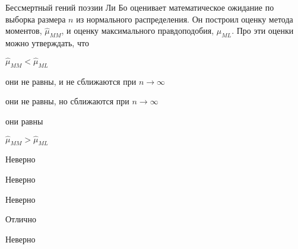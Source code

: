 
\begin{question}
Бессмертный гений поэзии Ли Бо оценивает математическое ожидание по
выборка размера \(n\) из нормального распределения. Он построил оценку
метода моментов, \(\hat{\mu}_{MM}\), и оценку максимального
правдоподобия, \(\hat{\mu}_{ML}\). Про эти оценки можно утверждать, что
\begin{answerlist}
  \item \(\hat\mu_{MM}<\hat\mu_{ML}\)
  \item они не равны, и не сближаются при \(n\to \infty\)
  \item они не равны, но сближаются при \(n\to \infty\)
  \item они равны
  \item \(\hat\mu_{MM}>\hat\mu_{ML}\)
\end{answerlist}
\end{question}

\begin{solution}
\begin{answerlist}
  \item Неверно
  \item Неверно
  \item Неверно
  \item Отлично
  \item Неверно
\end{answerlist}
\end{solution}

